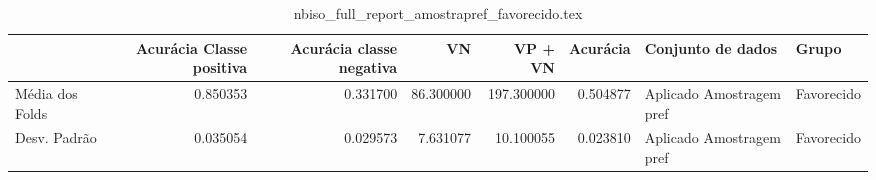 \begin{table}
\centering
\caption{nbiso_full_report_amostrapref_favorecido.tex}
\label{nbiso_full_report_amostrapref_favorecido.tex}
\begin{tabular}{lrrrrrll}
\toprule
{} &  Acurácia Classe positiva &  Acurácia classe negativa &        VN  &    VP + VN  &  Acurácia &         Conjunto de dados &       Grupo \\
\midrule
Média dos Folds &                  0.850353 &                  0.331700 &  86.300000 &  197.300000 &  0.504877 &  Aplicado Amostragem pref &  Favorecido \\
Desv. Padrão    &                  0.035054 &                  0.029573 &   7.631077 &   10.100055 &  0.023810 &  Aplicado Amostragem pref &  Favorecido \\
\bottomrule
\end{tabular}
\end{table}
